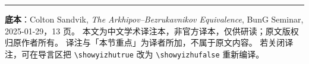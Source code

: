 \vfill
\noindent\rule{\linewidth}{0.4pt}
{\footnotesize
\textbf{底本}：Colton Sandvik, \emph{The Arkhipov–Bezrukavnikov Equivalence},
BunG Seminar, 2025-01-29，13 页。
本文为中文学术译注本，非官方译本，仅供研读；原文版权归原作者所有。
译注与「本节重点」为译者所加，不属于原文内容。
若关闭译注，可在导言区把 \texttt{\textbackslash showyizhutrue} 改为 \texttt{\textbackslash showyizhufalse} 重新编译。\par}
